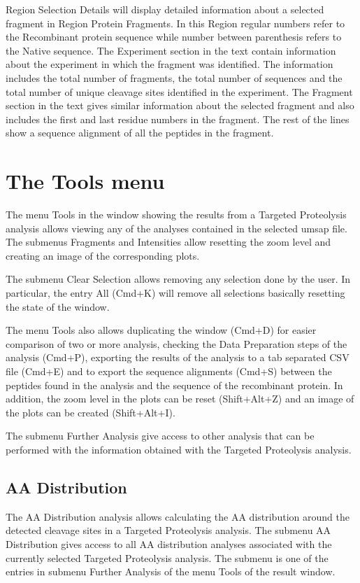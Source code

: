 Region Selection Details will display detailed information about a selected fragment
in Region Protein Fragments. In this Region regular numbers refer to the Recombinant
protein sequence while number between parenthesis refers to the Native sequence.
The Experiment section in the text contain information about the experiment in which
the fragment was identified. The information includes the total number of fragments,
the total number of sequences and the total number of unique cleavage sites identified
in the experiment. The Fragment section in the text gives similar information about
the selected fragment and also includes the first and last residue numbers in the
fragment. The rest of the lines show a sequence alignment of all the peptides in
the fragment.

\section{The Tools menu}

The menu Tools in the window showing the results from a Targeted Proteolysis analysis
allows viewing any of the analyses contained in the selected umsap file. The
submenus Fragments and Intensities allow resetting the zoom level and creating an image
of the corresponding plots.

The submenu Clear Selection allows removing any selection done by the user. In
particular, the entry All (Cmd+K) will remove all selections basically resetting
the state of the window.

The menu Tools also allows duplicating the window (Cmd+D) for easier comparison of
two or more analysis, checking the Data Preparation steps of the analysis (Cmd+P),
exporting the results of the analysis to a tab separated CSV file (Cmd+E) and to
export the sequence alignments (Cmd+S) between the peptides found in the analysis
and the sequence of the recombinant protein. In addition, the zoom level in the plots
can be reset (Shift+Alt+Z) and an image of the plots can be created (Shift+Alt+I).

The submenu Further Analysis give access to other analysis that can be performed
with the information obtained with the Targeted Proteolysis analysis.

\subsection{AA Distribution}
\label{subsec:tarprotAA}
The AA Distribution analysis allows calculating the AA distribution around
the detected cleavage sites in a Targeted Proteolysis analysis. The submenu AA Distribution
gives access to all AA distribution analyses associated with the currently selected
Targeted Proteolysis analysis. The submenu is one of the entries in submenu Further
Analysis of the menu Tools of the result window.

